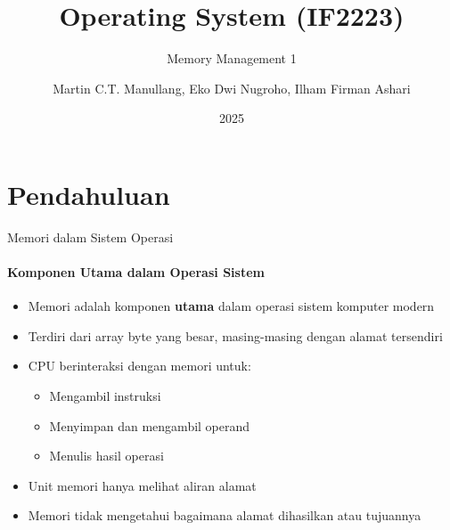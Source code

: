 \documentclass[10pt,aspectratio=169]{beamer}
\title{Operating System (IF2223)}
\subtitle{Memory Management 1}
\author{Martin C.T. Manullang, Eko Dwi Nugroho, Ilham Firman Ashari}
\institute[COMP]{Teknik Informatika, ITERA}
\date{2025}
\begin{document}
\maketitle

\section{Pendahuluan}

\begin{frame}{Memori dalam Sistem Operasi}
    \framesubtitle{Komponen Utama dalam Operasi Sistem}
    \begin{itemize}
        \item Memori adalah komponen \textbf{utama} dalam operasi sistem komputer modern
        \item Terdiri dari array byte yang besar, masing-masing dengan alamat tersendiri
        \item CPU berinteraksi dengan memori untuk:
        \begin{itemize}
            \item Mengambil instruksi
            \item Menyimpan dan mengambil operand
            \item Menulis hasil operasi
        \end{itemize}
        \item Unit memori hanya melihat aliran alamat
        \item Memori tidak mengetahui bagaimana alamat dihasilkan atau tujuannya
    \end{itemize}
\end{frame}
\end{document}
